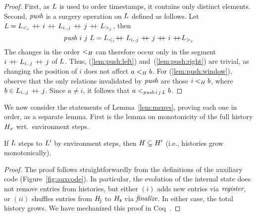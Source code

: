 \begin{proof}
First, as $L$ is used to order timestamps, it contains only
distinct elements. Second, $\textit{push}$ is a surgery operation on
$L$ defined as follows.  Let $\ordlist = \ordlist_{<_i}\ \cat
\ i\ \cat\ \ordlist_{i..j}\ \cat\ j\ \cat\ \ordlist_{>_j}$, then
%
$$\aux{push}\ i\ j\ \ordlist = \ordlist_{<_i} \cat\  \ordlist_{i..j}\
  \cat\ j\ \cat\ i\ \cat \ordlist_{>_j}$$
%
%
The changes in the order $\mathrel{<_H}$ can therefore occur only in the
segment $ i\ \cat\ \ordlist_{i..j}\ \cat\ j$ of $L$.
%
Thus, (\ref{lem:push:left}) and~(\ref{lem:push:right}) are trivial, as
changing the position of $i$ does not affect $a \mathrel{<_H} b$. For
(\ref{lem:push:window}), observe that the only relations invalidated
by $\textit{push}$ are those $ i \mathrel{<_H} b$, where $b \in
L_{i..j}\ {\mathrel{+\!\!+}}\ j$. Since $a \neq i$, it follows that $ a
<_{\textit{push}\, i\, j\, L} b$.
\end{proof}

We now consider the statements of Lemma~\ref{lem:menvs}, proving each
one in order, as a separate lemma. First is the lemma on monotonicity
of the full history $H_x$ wrt.~environment steps.



\begin{lemma}\label{lem:hist-mono}
If $L$ steps to $L'$ by environment steps, then $H
\subseteq H'$ (i.e., histories grow monotonically).
\end{lemma}

\begin{proof}
The proof follows straightforwardly from the definitions of the
auxiliary code (Figure~\ref{fig:auxcode}). In particular, the
evolution of the internal state does not remove entries from
histories, but either $(i)$ adds new entries via $\textit{register}$, or
$(ii)$ shuffles entries from $H_{\mathsf{j}}$ to $H_{\mathsf{s}}$ via
$\textit{finalize}$. In either case, the total history grows. We have
mechanized this proof in Coq~\cite{CoqFiles}.
\end{proof}

